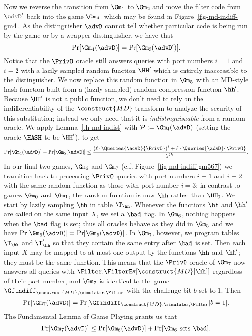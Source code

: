 	Now we reverse the transition from $\Gm_1$ to $\Gm_2$ and move the filter code from $\advD^{\prime}$ back into the game $\Gm_4$, which may be found in Figure~\ref{fig-md-indiff-gm4}.
	As the distinguisher $\advD$ cannot tell whether particular code is being run by the game or by a wrapper distinguisher, we have that 
	\[ \Pr[\Gm_4(\advD)] = \Pr[\Gm_3(\advD^{\prime})] .\] 
	Notice that the $\PrivO$ oracle still answers queries with port numbers $i=1$ and $i=2$ with a lazily-sampled random function $\HH^{\prime}$ which is entirely inaccessible to the distinguisher.
	We now replace this random function in $\Gm_5$ with an MD-style hash function built from a (lazily-sampled) random compression function $\hh^{\prime}$.
	Because $\HH^{\prime}$ is not a public function, we don't need to rely on the indifferentiability of the $\construct{MD}$ transform to analyze the security of this substitution; instead we only need that it is \textit{indistinguishable} from a random oracle.
	We apply Lemma~\ref{th-md-indist} with $\mathcal{P}:= \Gm_4(\advD)$ (setting the oracle $\HASH$ to be $\HH^{\prime}$), to get
	\[ \Pr[\Gm_4(\advD)]  - \Pr[\Gm_5(\advD)] \leq \frac{(\ell \cdot \Queries{\advD}{\PrivO})^2 + \ell \cdot \Queries{\advD}{\PrivO}}{2^{2k}}.\]
	In our final two games, $\Gm_6$ and $\Gm_7$ (c.f. Figure~\ref{fig-md-indiff-gm567}) we transition back to processing $\PrivO$ queries with port numbers $i=1$ and $i=2$ with the same random function as those with port number $i=3$; in contrast to games $\Gm_0$ and $\Gm_1$, the random function is now $\hh$ rather than $\HH_0$.
	We start by lazily sampling $\hh$ in table $\T_{\hh}$.
	Whenever the functions $\hh$ and $\hh^{\prime}$ are called on the same input $X$, we set a $\bad$ flag.
	In $\Gm_6$, nothing happens when the $\bad$ flag is set; thus all oracles behave as they did in $\Gm_5$ and we have $\Pr[\Gm_6(\advD)] = \Pr[\Gm_5(\advD)]$. 
	In $\Gm_7$, however, we program tables $\T_{\hh}$ and $\T_{\hh}^{\prime}$ so that they contain the same entry after $\bad$ is set. 
	Then each input $X$ may be mapped to at most one output by the functions $\hh$ and $\hh^{\prime}$; they must be the same function.
	This means that the $\PrivO$ oracle of $\Gm_7$ now answers all queries with $\Filter.\FilterEv[\construct{MD}[\hh]]$ regardless of their port number, and $\Gm_7$ is identical to the game $\Gfindiff_{\construct{MD}, \simulator, \Filter}$ with the challenge bit $b$ set to $1$.
	Then 
	\[\Pr[\Gm_7(\advD)] = \Pr[\Gfindiff_{\construct{MD}, \simulator, \Filter} | b =1].\]
	The Fundamental Lemma of Game Playing grants us that 
	\[ \Pr[\Gm_7(\advD)] \leq \Pr[\Gm_6(\advD)] + \Pr[\Gm_6 \text{ sets } \bad]. \]

